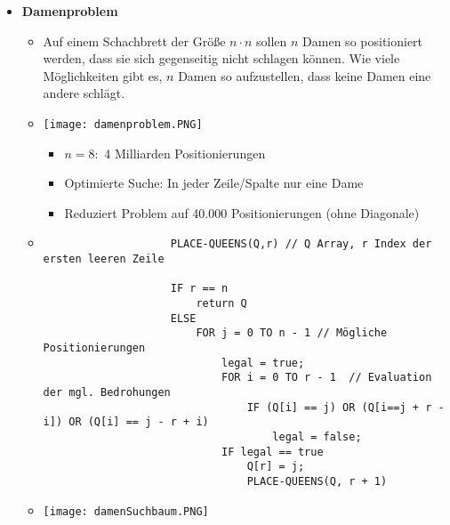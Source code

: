 \begin{itemize}
        \item \textbf{Damenproblem}
            \begin{itemize}
                \item[]
                    Auf einem Schachbrett der Größe $n \cdot n$ sollen $n$ Damen so positioniert werden, dass sie sich 
                    gegenseitig nicht schlagen können. Wie viele Möglichkeiten gibt es, $n$ Damen so aufzustellen, dass keine
                    Damen eine andere schlägt.
                \item[]
                    \begin{minipage}{0.3\textwidth}
                        \texttt{[image: damenproblem.PNG]}
                    \end{minipage}
                    \begin{minipage}{0.6\textwidth}
                        \begin{itemize}
                            \item $n=8:$ 4 Milliarden Positionierungen
                            \item Optimierte Suche: In jeder Zeile/Spalte nur eine Dame
                            \item Reduziert Problem auf 40.000 Positionierungen (ohne Diagonale)
                        \end{itemize}
                    \end{minipage}
                \item[]
                    \begin{verbatim}
                    PLACE-QUEENS(Q,r) // Q Array, r Index der ersten leeren Zeile

                    IF r == n
                        return Q
                    ELSE
                        FOR j = 0 TO n - 1 // Mögliche Positionierungen
                            legal = true;
                            FOR i = 0 TO r - 1  // Evaluation der mgl. Bedrohungen
                                IF (Q[i] == j) OR (Q[i==j + r - i]) OR (Q[i] == j - r + i)
                                    legal = false;
                            IF legal == true
                                Q[r] = j;
                                PLACE-QUEENS(Q, r + 1)
                    \end{verbatim}
                \item[] \texttt{[image: damenSuchbaum.PNG]}
            \end{itemize}


\end{itemize}

